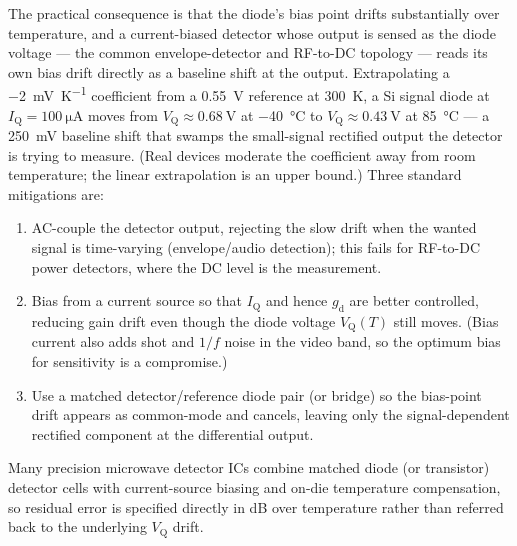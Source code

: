 \documentclass[12pt]{article}
\newcommand{\VQ}{V_{\mathrm{Q}}}
\newcommand{\IQ}{I_{\mathrm{Q}}}
\newcommand{\gd}{g_{\mathrm{d}}}
\begin{document}
The practical consequence is that the diode's bias point drifts substantially over temperature, and a current-biased detector whose output is sensed as the diode voltage --- the common envelope-detector and RF-to-DC topology --- reads its own bias drift directly as a baseline shift at the output. Extrapolating a \SI{-2}{\milli\volt\per\kelvin} coefficient from a \SI{0.55}{\volt} reference at \SI{300}{\kelvin}, a Si signal diode at $\IQ = \SI{100}{\micro\ampere}$ moves from $\VQ \approx \SI{0.68}{\volt}$ at \SI{-40}{\degreeCelsius} to $\VQ \approx \SI{0.43}{\volt}$ at \SI{85}{\degreeCelsius} --- a \SI{250}{\milli\volt} baseline shift that swamps the small-signal rectified output the detector is trying to measure. (Real devices moderate the coefficient away from room temperature; the linear extrapolation is an upper bound.) Three standard mitigations are:
\begin{enumerate}
    \item AC-couple the detector output, rejecting the slow drift when the wanted signal is time-varying (envelope/audio detection); this fails for RF-to-DC power detectors, where the DC level is the measurement.
    \item Bias from a current source so that $\IQ$ and hence $\gd$ are better controlled, reducing gain drift even though the diode voltage $\VQ(T)$ still moves. (Bias current also adds shot and $1/f$ noise in the video band, so the optimum bias for sensitivity is a compromise.)
    \item Use a matched detector/reference diode pair (or bridge) so the bias-point drift appears as common-mode and cancels, leaving only the signal-dependent rectified component at the differential output.
\end{enumerate}
Many precision microwave detector ICs combine matched diode (or transistor) detector cells with current-source biasing and on-die temperature compensation, so residual error is specified directly in dB over temperature rather than referred back to the underlying $\VQ$ drift.
\end{document}
